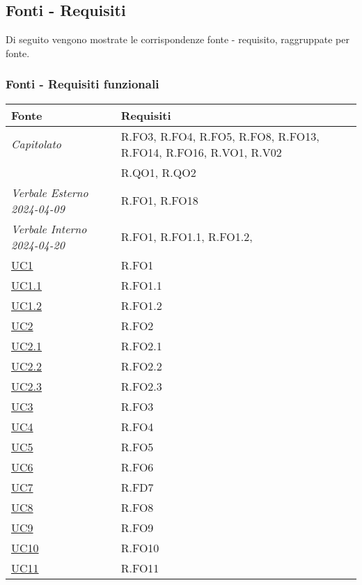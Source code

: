 \subsection{Fonti - Requisiti}
Di seguito vengono mostrate le corrispondenze fonte - requisito, raggruppate per fonte.

\subsubsection{Fonti - Requisiti funzionali}

\begin{longtable}{|P{4,5cm}|>{\arraybackslash}P{9cm}|}
  \hline
  \textbf{Fonte} & \textbf{Requisiti} \\
  \hline
  \emph{Capitolato} & R.FO3, R.FO4, R.FO5, R.FO8, R.FO13, R.FO14, R.FO16, R.VO1, R.V02 \\
  \hline
  \NdP{} & R.QO1, R.QO2 \\
  \hline
  \emph{Verbale Esterno 2024-04-09} & R.FO1, R.FO18 \\
  \hline
  \emph{Verbale Interno 2024-04-20} & R.FO1, R.FO1.1, R.FO1.2,  \\
  \hline
  \hyperref[UC1]{UC1} & R.FO1 \\
  \hline
  \hyperref[UC1point1]{UC1.1} & R.FO1.1 \\
  \hline
  \hyperref[UC1]{UC1.2} & R.FO1.2 \\
  \hline
  \hyperref[UC2]{UC2} & R.FO2 \\
  \hline
  \hyperref[UC2point1]{UC2.1} & R.FO2.1 \\
  \hline
  \hyperref[UC2point2]{UC2.2} & R.FO2.2 \\
  \hline
  \hyperref[UC2point3]{UC2.3} & R.FO2.3 \\
  \hline
  \hyperref[UC3]{UC3} & R.FO3 \\
  \hline
  \hyperref[UC4]{UC4} & R.FO4 \\
  \hline
  \hyperref[UC5]{UC5} & R.FO5 \\
  \hline
  \hyperref[UC6]{UC6} & R.FO6 \\
  \hline
  \hyperref[UC7]{UC7} & R.FD7 \\
  \hline
  \hyperref[UC8]{UC8} & R.FO8 \\
  \hline
  \hyperref[UC9]{UC9} & R.FO9 \\
  \hline
  \hyperref[UC10]{UC10} & R.FO10 \\
  \hline
  \hyperref[UC11]{UC11} & R.FO11 \\

\end{longtable}
